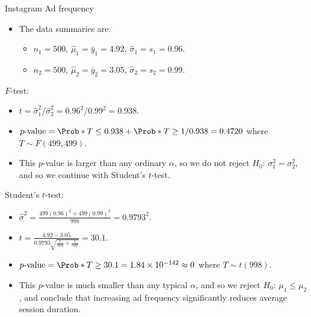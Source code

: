 \begin{Example}{Instagram Ad frequency}{}
\begin{itemize}
                  \centerline{$ H_0 $: $ \mu_1\le \mu_2 $ versus $ H_\text{A} $: $ \mu_1>\mu_2 $}
            \item The data summaries are:
                  \begin{itemize}
                        \item $ n_1=500 $, $ \hat{\mu}_1=\bar{y}_1=4.92 $, $ \hat{\sigma}_1=s_1=0.96 $.
                        \item $ n_2=500 $, $ \hat{\mu}_2=\bar{y}_2=3.05 $, $ \hat{\sigma}_2=s_2=0.99 $.
                  \end{itemize}
      \end{itemize}
      \begin{framed}
            $ F $-test:
            \begin{itemize}
                  \item $ t=\hat{\sigma}_1^2/\hat{\sigma}_2^2=0.96^2/0.99^2=0.938 $.
                  \item $ p\text{-value}=\Prob*{T\le 0.938}+\Prob*{T\ge 1/0.938}=0.4720 $
                        where $ T \sim F(499,499) $.
                  \item This $ p $-value is larger than any ordinary $ \alpha $, so
                        we do not reject $ H_0 $: $ \sigma_1^2=\sigma_2^2 $, and so we continue
                        with Student's $ t $-test.
            \end{itemize}
      \end{framed}
      \begin{framed}
            Student's $ t $-test:
            \begin{itemize}
                  \item $ \displaystyle \hat{\sigma}^2=\frac{499(0.96)^2+499(0.99)^2}{998}=0.9793^2 $.
                  \item $ \displaystyle t=\frac{4.92-3.05}{0.9793\sqrt{\frac{1}{500} +\frac{1}{500} }}=30.1  $.
                  \item $ p\text{-value}=\Prob*{T\ge 30.1}=1.84\times 10^{-142}\approx 0 $ where $ T \sim t(998) $.
                  \item This $ p $-value is much smaller than any typical $ \alpha $, and so we reject
                        $ H_0 $: $ \mu_1\le \mu_2 $, and conclude that increasing ad frequency significantly
                        reduces average session duration.
            \end{itemize}
      \end{framed}
\end{Example}
